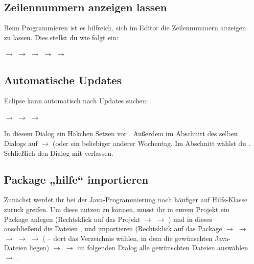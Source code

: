 \subsection{Zeilennummern anzeigen lassen}

Beim Programmieren ist es hilfreich, sich im Editor die Zeilennummern anzeigen
zu lassen. Dies stellst du wie folgt ein:

 $\rightarrow$  $\rightarrow$
 $\rightarrow$  $\rightarrow$  $\rightarrow$ 

\subsection{Automatische Updates} 

Eclipse kann automatisch nach Updates suchen:

 $\rightarrow$  $\rightarrow$
 $\rightarrow$  

In diesem Dialog ein Häkchen Setzen vor . Außerdem im Abschnitt  des selben
Dialogs auf  $\rightarrow$
 (oder ein beliebiger anderer Wochentag. Im Abschnitt
 wählst du . Schließlich den Dialog mit
 verlassen.

\subsection{Package „hilfe“ importieren}

Zunächst werdet ihr bei der Java-Programmierung noch häufiger auf Hilfs-Klasse
 zurück greifen. Um diese nutzen zu können, müsst ihr in eurem
Projekt ein Package  anlegen (Rechtsklick auf das Projekt
$\rightarrow$  $\rightarrow$ ) und in dieses
anschließend die Dateien  ,  und
 importieren (Rechtsklick auf das Package
$\rightarrow$  $\rightarrow$ 
$\rightarrow$  $\rightarrow$  $\rightarrow$
 ( -- dort das Verzeichnis wählen, in dem
die gewünschten Java-Dateien liegen) $\rightarrow$  $\rightarrow$
im folgenden Dialog alle gewünschten Dateien auswählen $\rightarrow$
.

